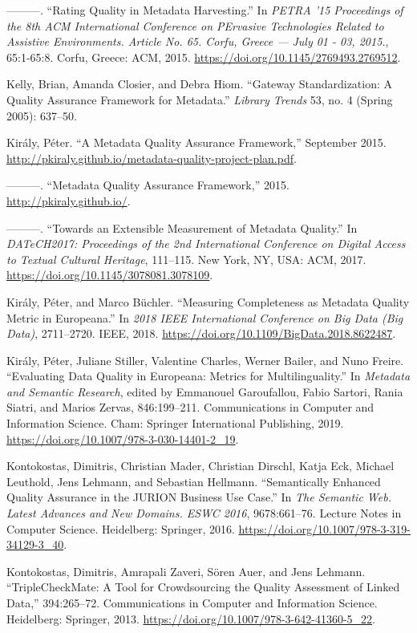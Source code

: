 ———. “Rating Quality in Metadata Harvesting.” In \emph{PETRA ’15 Proceedings of the 8th ACM International Conference on PErvasive Technologies Related to Assistive Environments. Article No. 65. Corfu, Greece — July 01 - 03, 2015.}, 65:1-65:8. Corfu, Greece: ACM, 2015. \url{https://doi.org/10.1145/2769493.2769512}.

Kelly, Brian, Amanda Closier, and Debra Hiom. “Gateway Standardization: A Quality Assurance Framework for Metadata.” \emph{Library Trends} 53, no. 4 (Spring 2005): 637–50.

Király, Péter. “A Metadata Quality Assurance Framework,” September 2015. \url{http://pkiraly.github.io/metadata-quality-project-plan.pdf}.

———. “Metadata Quality Assurance Framework,” 2015. \url{http://pkiraly.github.io/}.

———. “Towards an Extensible Measurement of Metadata Quality.” In \emph{DATeCH2017: Proceedings of the 2nd International Conference on Digital Access to Textual Cultural Heritage}, 111–115. New York, NY, USA: ACM, 2017. \url{https://doi.org/10.1145/3078081.3078109}.

Király, Péter, and Marco Büchler. “Measuring Completeness as Metadata Quality Metric in Europeana.” In \emph{2018 IEEE International Conference on Big Data (Big Data)}, 2711–2720. IEEE, 2018. \url{https://doi.org/10.1109/BigData.2018.8622487}.

Király, Péter, Juliane Stiller, Valentine Charles, Werner Bailer, and Nuno Freire. “Evaluating Data Quality in Europeana: Metrics for Multilinguality.” In \emph{Metadata and Semantic Research}, edited by Emmanouel Garoufallou, Fabio Sartori, Rania Siatri, and Marios Zervas, 846:199–211. Communications in Computer and Information Science. Cham: Springer International Publishing, 2019. \url{https://doi.org/10.1007/978-3-030-14401-2_19}.

Kontokostas, Dimitris, Christian Mader, Christian Dirschl, Katja Eck, Michael Leuthold, Jens Lehmann, and Sebastian Hellmann. “Semantically Enhanced Quality Assurance in the JURION Business Use Case.” In \emph{The Semantic Web. Latest Advances and New Domains. ESWC 2016}, 9678:661–76. Lecture Notes in Computer Science. Heidelberg: Springer, 2016. \url{https://doi.org/10.1007/978-3-319-34129-3_40}.

Kontokostas, Dimitris, Amrapali Zaveri, Sören Auer, and Jens Lehmann. “TripleCheckMate: A Tool for Crowdsourcing the Quality Assessment of Linked Data,” 394:265–72. Communications in Computer and Information Science. Heidelberg: Springer, 2013. \url{https://doi.org/10.1007/978-3-642-41360-5_22}.

